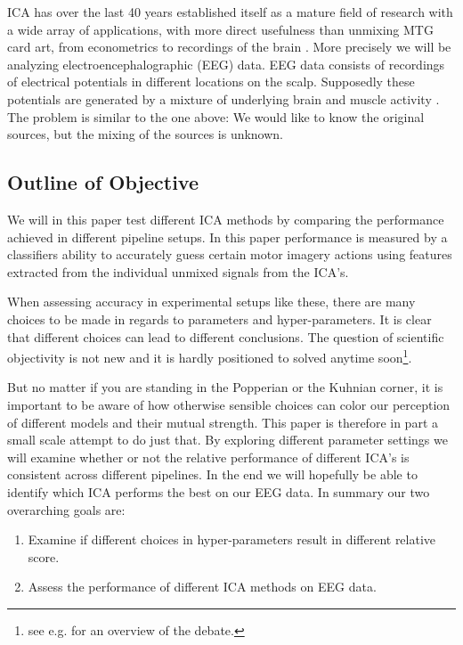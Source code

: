 ICA has over the last 40 years established itself as a mature field of research with a wide array of applications, with more direct usefulness than unmixing MTG card art, from econometrics to recordings of the brain \cite[pp.11-12]{hyvarinen2000}. More precisely we will be analyzing electroencephalographic (EEG) data. EEG data consists of recordings of electrical potentials in different locations on the scalp. Supposedly these potentials are generated by a mixture of underlying brain and muscle activity \cite[p.150]{hyvarinen2000}. The problem is similar to the one above: We would like to know the original sources, but the mixing of the sources is unknown.

\subsection{Outline of Objective}

We will in this paper test different ICA methods by comparing the performance achieved in different pipeline setups. In this paper performance is measured by a classifiers ability to accurately guess certain motor imagery actions using features extracted from the individual unmixed signals from the ICA's.

When assessing accuracy in experimental setups like these, there are many choices to be made in regards to parameters and hyper-parameters. It is clear that different choices can lead to different conclusions. The question of scientific objectivity is not new and it is hardly positioned to solved anytime soon\footnote{see e.g. \cite{sep-scientific-realism} for an overview of the debate.}. 

But no matter if you are standing in the Popperian or the Kuhnian corner, it is important to be aware of how otherwise sensible choices can color our perception of different models and their mutual strength. This paper is therefore in part a small scale attempt to do just that. By exploring different parameter settings we will examine whether or not the relative performance of different ICA's is consistent across different pipelines. In the end we will hopefully be able to identify which ICA performs the best on our EEG data. In summary our two overarching goals are:

\begin{enumerate}[label=\alph*),noitemsep]
	\item Examine if different choices in hyper-parameters result in different relative score.
	\item Assess the performance of different ICA methods on EEG data.
\end{enumerate}
